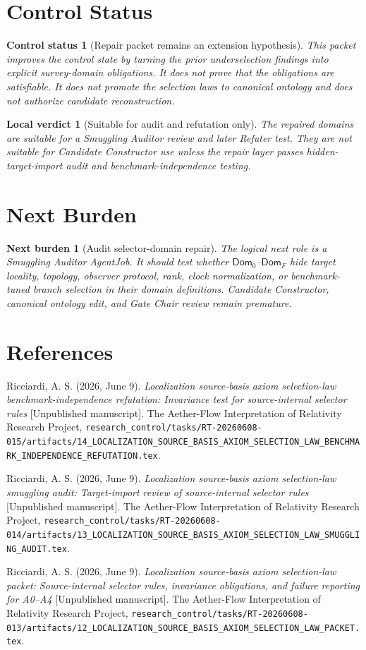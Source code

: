 \documentclass[11pt]{article}
\newcommand{\Dom}{\mathsf{Dom}}
\newtheorem{status}{Control status}
\newtheorem{verdict}{Local verdict}
\newtheorem{nextburden}{Next burden}
\begin{document}
\section{Control Status}

\begin{status}[Repair packet remains an extension hypothesis]
This packet improves the control state by turning the prior underselection
findings into explicit survey-domain obligations. It does not prove that the
obligations are satisfiable. It does not promote the selection laws to
canonical ontology and does not authorize candidate reconstruction.
\end{status}

\begin{verdict}[Suitable for audit and refutation only]
The repaired domains are suitable for a Smuggling Auditor review and later
Refuter test. They are not suitable for Candidate Constructor use unless the
repair layer passes hidden-target-import audit and benchmark-independence
testing.
\end{verdict}

\section{Next Burden}

\begin{nextburden}[Audit selector-domain repair]
The logical next role is a Smuggling Auditor AgentJob. It should test whether
\(\Dom_0\)--\(\Dom_F\) hide target locality, topology, observer protocol,
rank, clock normalization, or benchmark-tuned branch selection in their
domain definitions. Candidate Constructor, canonical ontology edit, and Gate
Chair review remain premature.
\end{nextburden}

\section*{References}

Ricciardi, A. S. (2026, June 9). \emph{Localization source-basis axiom
selection-law benchmark-independence refutation: Invariance test for
source-internal selector rules} [Unpublished manuscript]. The Aether-Flow
Interpretation of Relativity Research Project,
\texttt{research\_control/tasks/RT-20260608-015/artifacts/14\_LOCALIZATION\_SOURCE\_BASIS\_AXIOM\_SELECTION\_LAW\_BENCHMARK\_INDEPENDENCE\_REFUTATION.tex}.

Ricciardi, A. S. (2026, June 9). \emph{Localization source-basis axiom
selection-law smuggling audit: Target-import review of source-internal
selector rules} [Unpublished manuscript]. The Aether-Flow Interpretation of
Relativity Research Project,
\texttt{research\_control/tasks/RT-20260608-014/artifacts/13\_LOCALIZATION\_SOURCE\_BASIS\_AXIOM\_SELECTION\_LAW\_SMUGGLING\_AUDIT.tex}.

Ricciardi, A. S. (2026, June 9). \emph{Localization source-basis axiom
selection-law packet: Source-internal selector rules, invariance obligations,
and failure reporting for A0--A4} [Unpublished manuscript]. The Aether-Flow
Interpretation of Relativity Research Project,
\texttt{research\_control/tasks/RT-20260608-013/artifacts/12\_LOCALIZATION\_SOURCE\_BASIS\_AXIOM\_SELECTION\_LAW\_PACKET.tex}.
\end{document}
